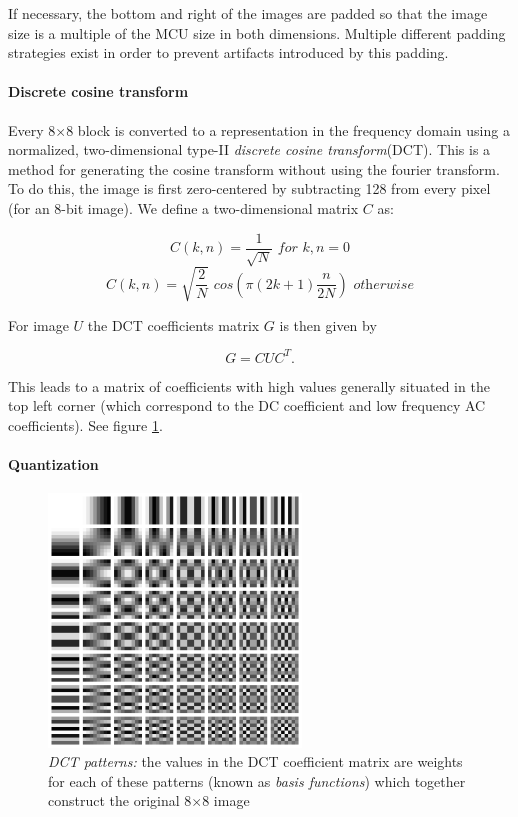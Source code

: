 If necessary, the bottom and right of the images are padded so that the image size is a multiple of the MCU size in both dimensions. Multiple different padding strategies exist in order to prevent artifacts introduced by this padding.

\paragraph{Discrete cosine transform}
Every 8$\times$8 block is converted to a representation in the frequency domain using a normalized, two-dimensional type-II \emph{discrete cosine transform}(DCT)\cite{nara_dct}. This is a method for generating the cosine transform without using the fourier transform. To do this, the image is first zero-centered by subtracting 128 from every pixel (for an 8-bit image). We define a two-dimensional matrix $C$ as:

$$
C(k,n) = \frac{1}{\sqrt{N}} \textit{ for }  k,n=0
$$
$$
C(k,n) = \sqrt{\frac{2}{N}} \textit{ cos}( \pi (2k + 1)  \frac{n}{2N})   \textit{ otherwise}
$$

\noindent For image $U$ the DCT coefficients matrix $G$ is then given by 

$$
G = CUC^T.
$$

This leads to a matrix of coefficients with high values generally situated in the top left corner (which correspond to the DC coefficient and low frequency AC coefficients). See figure \ref{fig_dct}.

\paragraph{Quantization}

\begin{figure}[ht]
    \centering
        \includegraphics[width=0.6\textwidth]{../graphics/Dctjpeg_white.png}
    \caption[Short caption to special figure]{\textit{DCT patterns:} the values in the DCT coefficient matrix are weights for each of these patterns (known as \emph{basis functions}) which together construct the original 8$\times$8 image}
    \label{fig_dct}
\end{figure}



